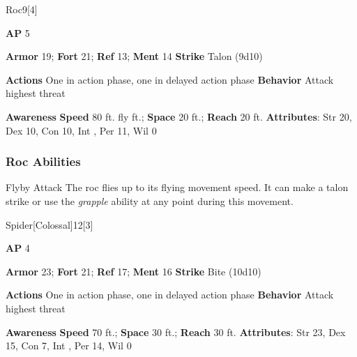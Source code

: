 \begin{monsection}{Roc}{9}[4]
\vspace{-1em}\vspace{-1em}
\begin{spellcontent}
\begin{spelltargetinginfo}
{\textbf{AP} 5}

\pari \textbf{Armor} 19;
\textbf{Fort} 21;
\textbf{Ref} 13;
\textbf{Ment} 14
\pari \textbf{Strike} Talon  (9d10)


\pari \textbf{Actions} One in action phase, one in delayed action phase
\pari \textbf{Behavior} Attack highest threat
\end{spelltargetinginfo}
\end{spellcontent}

\begin{monsterfooter}
\pari \textbf{Awareness} 
\pari \textbf{Speed} 80 ft. fly ft.;
\textbf{Space} 20 ft.;
\textbf{Reach} 20 ft.
\pari \textbf{Attributes}:
Str 20,
Dex 10,
Con 10,
Int ,
Per 11,
Wil 0
\end{monsterfooter}
\end{monsection}


\subsubsection{Roc Abilities}

\begin{freeability}{Flyby Attack}
The roc flies up to its flying movement speed.
It can make a talon strike or use the \textit{grapple} ability at any point during this movement.
\end{freeability}

\begin{monsection}{Spider}[Colossal]{12}[3]
\vspace{-1em}\vspace{-1em}
\begin{spellcontent}
\begin{spelltargetinginfo}
{\textbf{AP} 4}

\pari \textbf{Armor} 23;
\textbf{Fort} 21;
\textbf{Ref} 17;
\textbf{Ment} 16
\pari \textbf{Strike} Bite  (10d10)


\pari \textbf{Actions} One in action phase, one in delayed action phase
\pari \textbf{Behavior} Attack highest threat
\end{spelltargetinginfo}
\end{spellcontent}

\begin{monsterfooter}
\pari \textbf{Awareness} 
\pari \textbf{Speed} 70 ft.;
\textbf{Space} 30 ft.;
\textbf{Reach} 30 ft.
\pari \textbf{Attributes}:
Str 23,
Dex 15,
Con 7,
Int ,
Per 14,
Wil 0
\end{monsterfooter}
\end{monsection}


